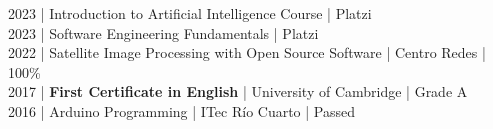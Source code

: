 {%
2023 | Introduction to Artificial Intelligence Course | Platzi \\
2023 | Software Engineering Fundamentals | Platzi \\
2022 | Satellite Image Processing with Open Source Software | Centro Redes | 100\% \\
2017 | \textbf{First Certificate in English} | University of Cambridge | Grade A \\
2016 | Arduino Programming | ITec Río Cuarto | Passed \\
}

\vspace{12pt}